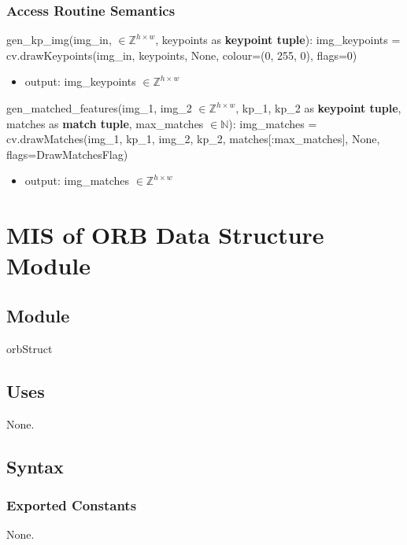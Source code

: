 \documentclass[12pt, titlepage]{article}
\begin{document}
\subsubsection{Access Routine Semantics}

\noindent gen\_kp\_img(img\_in, $\in \mathbb{Z}^{h \times w}$, keypoints 
as \textbf{keypoint tuple}):\newline
img\_keypoints = cv.drawKeypoints(img\_in, keypoints, None, colour=(0, 255, 0), 
flags=0)
\begin{itemize}
  \item output: img\_keypoints $\in \mathbb{Z}^{h \times w}$
\end{itemize}


\noindent gen\_matched\_features(img\_1, img\_2 $\in \mathbb{Z}^{h \times w}$,
kp\_1, kp\_2 as \textbf{keypoint tuple}, matches as \textbf{match tuple}, 
max\_matches $\in \mathbb{N}$): \newline 
img\_matches = cv.drawMatches(img\_1, kp\_1, img\_2, kp\_2, matches[:max\_matches], 
None, flags=DrawMatchesFlag) 
\begin{itemize}
  \item output: img\_matches $\in \mathbb{Z}^{h \times w}$
\end{itemize}



\section{MIS of ORB Data Structure Module} \label{mORB}


\subsection{Module}

orbStruct

\subsection{Uses}
None.

\subsection{Syntax}

\subsubsection{Exported Constants}
None.
\end{document}
